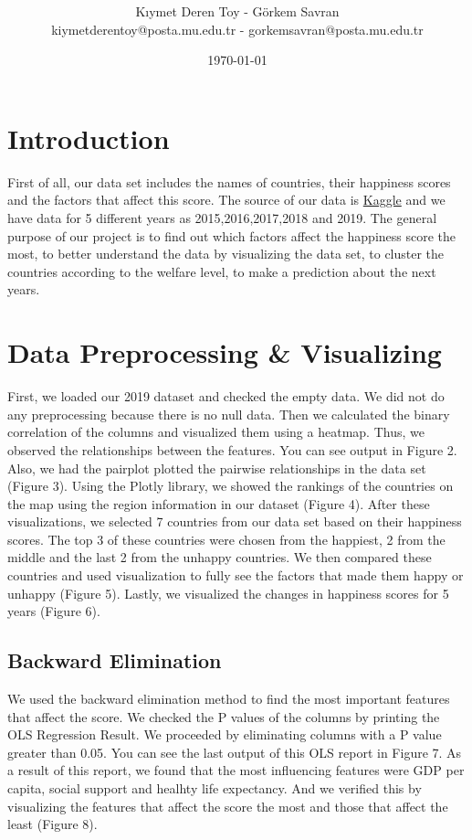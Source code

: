 \documentclass[onecolumn]{article}
\title{\spacecaps{World Happiness Report}\\ \normalsize \spacesc{Data Mining Final Project} }
\author{Kıymet Deren Toy - Görkem Savran\\kiymetderentoy@posta.mu.edu.tr - gorkemsavran@posta.mu.edu.tr}
\date{\today}
\begin{document}
\maketitle
{}\selectfont 
\section{Introduction}
First of all, our data set includes the names of countries, their happiness scores and the factors 
that affect this score. The source of our data is 
\href{https://www.kaggle.com/unsdsn/world-happiness?select=2019.csv}{Kaggle} and we have 
data for 5 
different years as 2015,2016,2017,2018 and 2019. The general purpose of our project is to 
find out 
which factors affect the happiness score the most, to better understand the data by 
visualizing the data set, to cluster the countries according to the welfare level, to make a prediction about the next years.

\section{Data Preprocessing \& Visualizing}
First, we loaded our 2019 dataset and checked the empty data. We did not do any 
preprocessing 
because there is no null data. Then we calculated the binary correlation of the columns and 
visualized them using a heatmap. Thus, we observed the relationships between the features. 
You can 
see output in Figure 2. Also, we had the pairplot plotted the pairwise relationships in the 
data set
(Figure 3). Using the Plotly library, we showed the rankings of the countries on the map 
using the 
region information in our dataset (Figure 4). After these visualizations, we selected 7 
countries 
from our data set based on their happiness scores. The top 3 of these countries were chosen 
from the
happiest, 2 from the middle and the last 2 from the unhappy countries. We then compared 
these 
countries and used visualization to fully see the factors that made them happy or unhappy 
(Figure 5). Lastly, we visualized the changes in happiness scores for 5 years (Figure 6).
\subsection{Backward Elimination}
We used the backward elimination method to find the most important features that affect the 
score. 
We checked the P values of the columns by printing the OLS Regression Result. We proceeded 
by 
eliminating columns with a P value greater than 0.05. You can see the last output of this 
OLS report
in Figure 7. As a result of this report, we found that the most influencing features were 
GDP per 
capita, social support and healhty life expectancy. And we verified this by visualizing the 
features that affect the score the most and those that affect the least (Figure 8).
\end{document}
